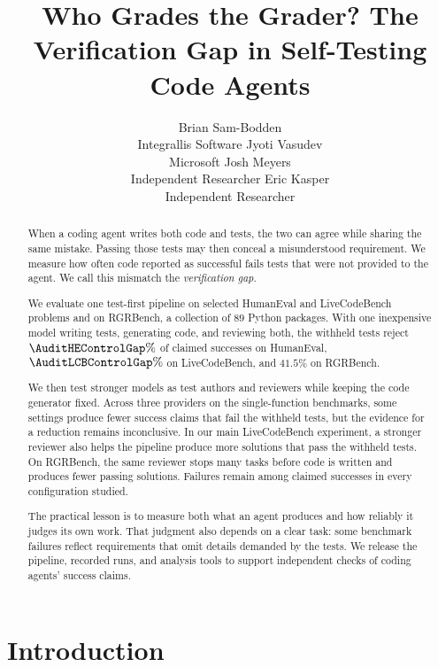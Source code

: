 \documentclass{article}
\begin{document}
\title{Who Grades the Grader? The Verification Gap in Self-Testing Code Agents}
\author{%
  Brian Sam-Bodden \\
  Integrallis Software
  \And
  Jyoti Vasudev \\
  Microsoft
  \And
  Josh Meyers \\
  Independent Researcher
  \And
  Eric Kasper \\
  Independent Researcher
}
\maketitle

\begin{abstract}
When a coding agent writes both code and tests, the two can agree while sharing the same
mistake. Passing those tests may then conceal a misunderstood requirement. We measure how
often code reported as successful fails tests that were not provided to the agent. We call this
mismatch the \emph{verification gap}.

We evaluate one test-first pipeline on selected HumanEval and LiveCodeBench problems and on
RGRBench, a collection of $89$ Python packages. With one inexpensive model writing tests,
generating code, and reviewing both, the withheld tests reject $\AuditHEControlGap\%$ of
claimed successes on HumanEval, $\AuditLCBControlGap\%$ on LiveCodeBench, and $41.5\%$ on
RGRBench.

We then test stronger models as test authors and reviewers while keeping the code generator
fixed. Across three providers on the single-function benchmarks, some settings produce fewer
success claims that fail the withheld tests, but the evidence for a reduction remains inconclusive.
In our main LiveCodeBench experiment, a stronger reviewer also helps the pipeline produce
more solutions that pass the withheld tests. On RGRBench, the same reviewer stops many tasks
before code is written and produces fewer passing solutions. Failures remain among claimed
successes in every configuration studied.

The practical lesson is to measure both what an agent produces and how reliably it judges
its own work. That judgment also depends on a clear task: some benchmark failures reflect
requirements that omit details demanded by the tests. We release the pipeline, recorded
runs, and analysis tools to support independent checks of coding agents' success claims.
\end{abstract}

\section{Introduction}
\label{sec:intro}
\end{document}
